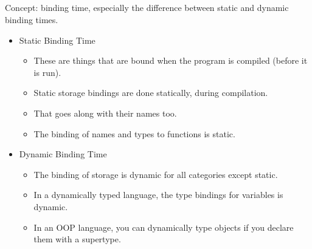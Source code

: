 \subsection{}
Concept: binding time, especially the difference between static and dynamic binding times.

\begin{itemize}
\item Static Binding Time
  \begin{itemize}[noitemsep]
  \item These are things that are bound when the program is compiled (before it is run).
  \item Static storage bindings are done statically, during compilation.
  \item That goes along with their names too.
  \item The binding of names and types to functions is static.
  \end{itemize}

\item Dynamic Binding Time
  \begin{itemize}[noitemsep]
  \item The binding of storage is dynamic for all categories except static.
  \item In a dynamically typed language, the type bindings for variables is dynamic.
  \item In an OOP language, you can dynamically type objects if you declare them with a supertype.
  \end{itemize}
\end{itemize}

